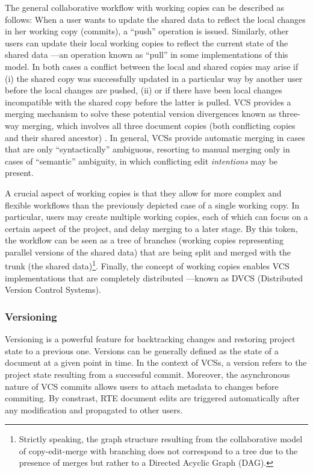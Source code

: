 \documentclass{sig-alternate}
\begin{document}
The general collaborative workflow with working copies can be described as follows:
When a user wants to update the shared data to reflect the local changes in her working copy
(commits), a ``push'' operation is issued. Similarly, other users can update their local
working copies to reflect the current state of the shared data ---an operation
known as ``pull'' in some implementations of this model.
In both cases a conflict between the local and shared copies may arise if (i) the shared
copy was successfully updated in a particular way by another user before the local changes
are pushed, (ii) or if there have been local changes incompatible with the shared copy before
the latter is pulled.
VCS provides a merging mechanism to solve these potential version divergences known as
three-way merging, which involves all three document copies (both conflicting copies and their
shared ancestor) \cite{Altmanninger2009}. In general, VCSs provide automatic merging in cases
that are only ``syntactically'' ambiguous, resorting to manual merging only in cases
of ``semantic'' ambiguity, in which conflicting edit \textit{intentions} may be present.

A crucial aspect of working copies is that they allow for more complex and flexible workflows
than the previously depicted case of a single working copy. In particular, users may create
multiple working copies, each of which can focus on a certain aspect of the project, and
delay merging to a later stage.
By this token, the workflow can be seen as a tree of branches (working copies
representing parallel versions of the shared data) that are being split and merged with
the trunk (the shared data)\footnote{
  Strictly speaking, the graph structure resulting from the collaborative model of copy-edit-merge
  with branching does not correspond to a tree due to the presence of merges but rather to a
  Directed Acyclic Graph (DAG).
}.
Finally, the concept of working copies enables VCS implementations that are completely distributed
---known as DVCS (Distributed Version Control Systems).

\subsubsection{Versioning}\label{subsec:versioning}
Versioning is a powerful feature for backtracking changes and restoring project state to a
previous one. Versions can be generally defined as the state of a document at a given point in time.
In the context of VCSs, a version refers to the project state resulting from a successful commit.
Moreover, the asynchronous nature of VCS commits allows users to attach metadata to changes before
commiting. By constrast, RTE document edits are triggered automatically after any modification and
propagated to other users.
\end{document}
